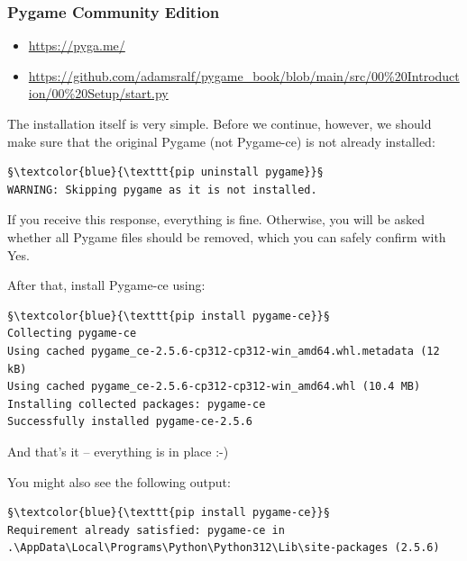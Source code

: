 \newpage
\subsubsection{Pygame Community Edition}
\begin{diskbox}
	\begin{itemize}
		\item  \url{https://pyga.me/}
		\item  \url{https://github.com/adamsralf/pygame_book/blob/main/src/00%20Introduction/00%20Setup/start.py}
	\end{itemize}

\end{diskbox}

The installation itself is very simple. Before we continue, however, we should make sure that the original Pygame (not Pygame-ce) is not already installed:

\lstset{firstnumber=1}
\begin{lstlisting}
§\textcolor{blue}{\texttt{pip uninstall pygame}}§
WARNING: Skipping pygame as it is not installed.
\end{lstlisting}

If you receive this response, everything is fine. Otherwise, you will be asked whether all Pygame files should be removed, which you can safely confirm with Yes.

After that, install Pygame-ce using:
\lstset{firstnumber=1}
\begin{lstlisting}
§\textcolor{blue}{\texttt{pip install pygame-ce}}§
Collecting pygame-ce
Using cached pygame_ce-2.5.6-cp312-cp312-win_amd64.whl.metadata (12 kB)
Using cached pygame_ce-2.5.6-cp312-cp312-win_amd64.whl (10.4 MB)
Installing collected packages: pygame-ce
Successfully installed pygame-ce-2.5.6
\end{lstlisting}

And that’s it -- everything is in place :-)

You might also see the following output:
\lstset{firstnumber=1}
\begin{lstlisting}
§\textcolor{blue}{\texttt{pip install pygame-ce}}§
Requirement already satisfied: pygame-ce in .\AppData\Local\Programs\Python\Python312\Lib\site-packages (2.5.6)
\end{lstlisting}

